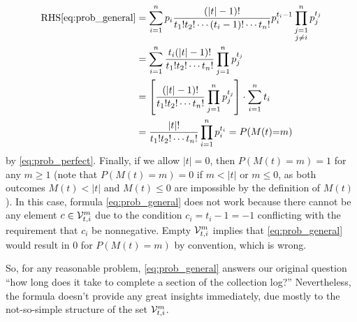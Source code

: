 \documentclass[letterpaper]{article}
\begin{document}
	\begin{align*}
		\text{RHS}\eqref{eq:prob_general} &= \sum_{i=1}^n p_i\frac{(|t|-1)!}{t_1!t_2!\cdots (t_i-1)!\cdots t_n!}p_i^{t_i-1}\prod_{\substack{j=1\\j\ne i }}^n p_j^{t_j} \\
		&= \sum_{i=1}^n \frac{t_i(|t|-1)!}{t_1!t_2!\cdots t_n!}\prod_{j=1}^np_j^{t_j} \\
		&= \left[\frac{(|t|-1)!}{t_1!t_2!\cdots t_n!}\prod_{j=1}^np_j^{t_j}\right]\cdot\sum_{i=1}^n t_i \\
		&= \frac{|t|!}{t_1!t_2!\cdots t_n!}\prod_{i=1}^np_i^{t_i} = P(M(t){=}m)
	\end{align*}
	by \eqref{eq:prob_perfect}. Finally, if we allow $|t| =0$, then $P(M(t){=}m) = 1$ for any $m\ge 1$ (note that $P(M(t){=}m) = 0$ if $m < |t|$ or $m \le 0$, as both outcomes $M(t) < |t|$ and $M(t) \le 0$ are impossible by the definition of $M(t)$). In this case, formula \eqref{eq:prob_general} does not work because there cannot be any element $c \in \mathcal{V}_{t, i}^{m}$ due to the condition $c_i = t_i - 1 = -1$ conflicting with the requirement that $c_i$ be nonnegative. Empty $\mathcal{V}_{t, i}^{m}$ implies that \eqref{eq:prob_general} would result in 0 for $P(M(t){=}m)$ by convention, which is wrong.
	
	So, for any reasonable problem, \eqref{eq:prob_general} answers our original question ``how long does it take to complete a section of the collection log?'' Nevertheless, the formula doesn't provide any great insights immediately, due mostly to the not-so-simple structure of the set $\mathcal{V}_{t, i}^{m}$. 
	
\end{document}
